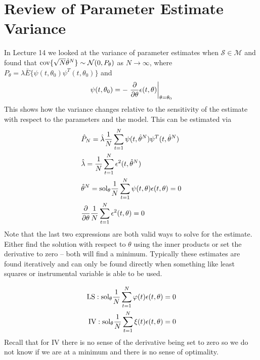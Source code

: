 \mainmatter%
\setcounter{page}{1}

\lectureseries[\course]{\course}

\date{November 17, 2009}

\setaddress%

\setcounter{lecture}{14}
\setcounter{chapter}{14}


\section{Review of Parameter Estimate Variance}
In Lecture 14 we looked at the variance of parameter estimates when $\mathcal{S}\in\mathcal{M}$ and found that $\text{cov}\{\sqrt{N}\hat{\theta}^N\} \sim \mathcal{N}(0,P_\theta)$ as $N\to\infty$, where $P_\theta = \lambda\bar{E}\{\psi(t,\theta_0)\psi^T(t,\theta_0)\}$ and
$$\psi(t,\theta_0) = -\left.\frac{\partial}{\partial\theta}\epsilon(t,\theta)\right|_{\theta=\theta_0}$$
This shows how the variance changes relative to the sensitivity of the estimate with respect to the parameters and the model.
This can be estimated via
\begin{align*}
&\hat{P}_N = \hat{\lambda}\frac{1}{N}\sum_{t=1}^N\psi(t,\hat{\theta}^N)\psi^T(t,\hat{\theta}^N) \\
&\hat{\lambda} = \frac{1}{N}\sum_{t=1}^N\epsilon^2(t,\hat{\theta}^N) \\
&\hat{\theta}^N = \text{sol}_\theta\frac{1}{N}\sum_{t=1}^N\psi(t,\theta)\epsilon(t,\theta) = 0 \\
&\frac{\partial}{\partial\theta}\frac{1}{N}\sum_{t=1}^N\epsilon^2(t,\theta) = 0
\end{align*}
Note that the last two expressions are both valid ways to solve for the estimate.
Either find the solution with respect to $\theta$ using the inner products or set the derivative to zero -- both will find a minimum.%
Typically these estimates are found iteratively and can only be found directly when something like least squares or instrumental variable is able to be used.

\begin{align*}
\text{LS}: \text{sol}_\theta \frac{1}{N}\sum_{t=1}^N\varphi(t)\epsilon(t,\theta) = 0 \\
\text{IV}: \text{sol}_\theta \frac{1}{N}\sum_{t=1}^N\xi(t)\epsilon(t,\theta) = 0
\end{align*}
Recall that for IV there is no sense of the derivative being set to zero so we do not know if we are at a minimum and there is no sense of optimality.

